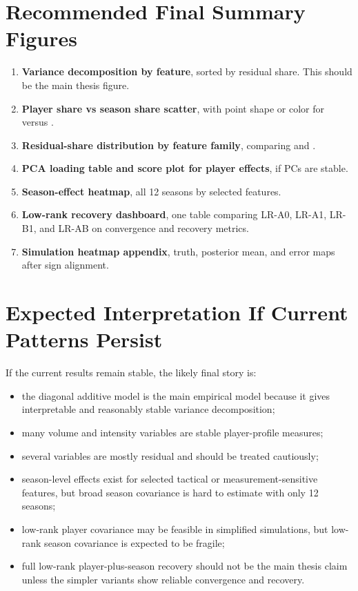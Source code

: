 \documentclass[11pt]{article}
\newcommand{\code}[1]{\texttt{\detokenize{#1}}}
\begin{document}
\section{Recommended Final Summary Figures}

\begin{enumerate}[leftmargin=*]
  \item \textbf{Variance decomposition by feature}, sorted by residual share.
  This should be the main thesis figure.
  \item \textbf{Player share vs season share scatter}, with point shape or color
  for \code{per90_*} versus \code{rate_*}.
  \item \textbf{Residual-share distribution by feature family}, comparing
  \code{per90_*} and \code{rate_*}.
  \item \textbf{PCA loading table and score plot for player effects}, if PCs are
  stable.
  \item \textbf{Season-effect heatmap}, all 12 seasons by selected features.
  \item \textbf{Low-rank recovery dashboard}, one table comparing LR-A0, LR-A1,
  LR-B1, and LR-AB on convergence and recovery metrics.
  \item \textbf{Simulation heatmap appendix}, truth, posterior mean, and error
  maps after sign alignment.
\end{enumerate}

\section{Expected Interpretation If Current Patterns Persist}

If the current results remain stable, the likely final story is:

\begin{itemize}[leftmargin=*]
  \item the diagonal additive model is the main empirical model because it gives
  interpretable and reasonably stable variance decomposition;
  \item many \code{per90_*} volume and intensity variables are stable
  player-profile measures;
  \item several \code{rate_*} variables are mostly residual and should be
  treated cautiously;
  \item season-level effects exist for selected tactical or measurement-sensitive
  features, but broad season covariance is hard to estimate with only 12 seasons;
  \item low-rank player covariance may be feasible in simplified simulations,
  but low-rank season covariance is expected to be fragile;
  \item full low-rank player-plus-season recovery should not be the main thesis
  claim unless the simpler variants show reliable convergence and recovery.
\end{itemize}
\end{document}
